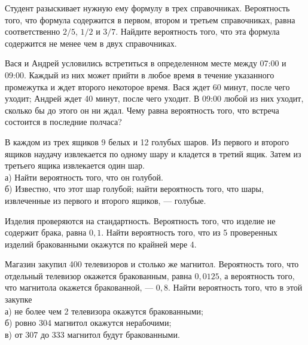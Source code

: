 \newpage\setcounter{zad}{0}



\begin{zkrW}{20}\noindent 
	Студент разыскивает нужную ему формулу в трех справочниках. Вероятность того, что формула содержится в первом, втором и третьем справочниках, равна соответственно $2/5$, $1/2$ и $3/7$. Найдите вероятность того, что эта формула содержится не менее чем в двух справочниках.
 
\end{zkrW}

\begin{zkrW}{20}\noindent 
	Вася и Андрей условились встретиться в определенном месте между 07:00 и 09:00. Каждый из них может прийти в любое время в течение указанного промежутка и ждет второго некоторое время. Вася ждет 60 минут, после чего уходит; Андрей ждет 40 минут, после чего уходит. В 09:00 любой из них уходит, сколько бы до этого он ни ждал. Чему равна вероятность того, что встреча состоится в последние полчаса?
 
\end{zkrW}

\begin{zkrW}{20}\noindent 
	В каждом из трех ящиков 9 белых и 12 голубых шаров. Из первого и второго ящиков наудачу извлекается по одному шару и кладется в третий ящик. Затем из третьего ящика извлекается один шар. \\ \indent а) Найти вероятность того, что он голубой. \\ \indent б) Известно, что этот шар голубой; найти вероятность того, что шары, извлеченные из первого и второго ящиков, --- голубые.
 
\end{zkrW}

\begin{zkrW}{20}\noindent 
	Изделия проверяются на стандартность. Вероятность того, что изделие не содержит брака, равна $0{,}1$. Найти вероятность того, что из 5 проверенных изделий бракованными окажутся по крайней мере 4.
 
\end{zkrW}

\begin{zkrW}{20}\noindent 
	Магазин закупил 400 телевизоров и столько же магнитол. Вероятность того, что отдельный телевизор окажется бракованным, равна $0{,}0125$, а вероятность того, что магнитола окажется бракованной, --- $0{,}8$. Найти вероятность того, что в этой закупке \\ \indent а) не более чем 2 телевизора окажутся бракованными; \\ \indent б) ровно 304 магнитол окажутся нерабочими; \\ \indent в) от 307 до 333 магнитол будут бракованными.
 
\end{zkrW}

